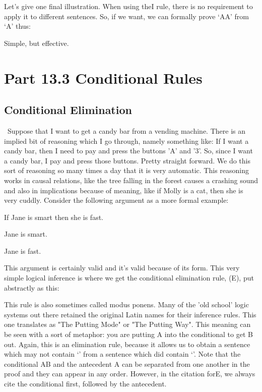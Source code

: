 Let’s give one final illustration. When using the\eand I rule, there is no requirement to apply it to different sentences. So, if we want, we can formally prove ‘A\eand  A’ from ‘A’ thus:

\begin{fitchproof}
\end{fitchproof}
Simple, but effective.

\section{Part 13.3 Conditional Rules}

\subsection{Conditional Elimination}

 Suppose that I want to get a candy bar from a vending machine. There is an implied bit of reasoning which I go through, namely something like: If I want a candy bar, then I need to pay and press the buttons 'A' and '3'. So, since I want a candy bar, I pay and press those buttons. Pretty straight forward. We do this sort of reasoning so many times a day that it is very automatic. This reasoning works in causal relations, like the tree falling in the forest causes a crashing sound and also in implications because of meaning, like if Molly is a cat, then she is very cuddly. Consider the following argument as a more formal example:
\begin{earg}
\item[] If Jane is smart then she is fast.
\item[] Jane is smart.
\item[\therefore] Jane is fast.
\end{earg}
This argument is certainly valid and it's valid because of its form. This very simple logical inference is where we get the conditional elimination rule, (\eif E), put abstractly as this:


This rule is also sometimes called modus ponens. Many of the 'old school' logic systems out there retained the original Latin names for their inference rules. This one translates as "The Putting Mode" or "The Putting Way". This meaning can be seen with a sort of metaphor: you are putting A into the conditional to get B out. Again, this is an elimination rule, because it allows us to obtain a sentence which may not contain ‘\eif ’ from a sentence which did contain ‘\eif ’. Note that the conditional A\eif B and the antecedent A can be separated from one another in the proof and they can appear in any order. However, in the citation for\eif E, we always cite the conditional first, followed by the antecedent.

